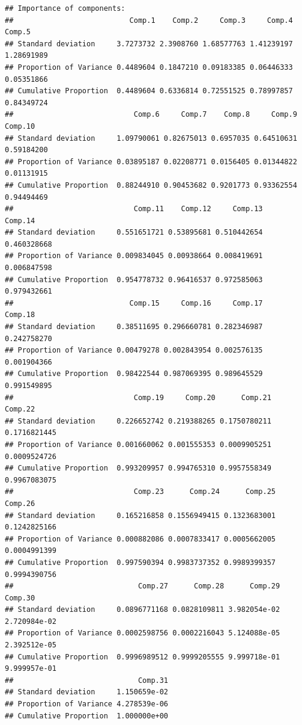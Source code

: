\documentclass[
]{article}
\begin{document}
\begin{verbatim}
## Importance of components:
##                           Comp.1    Comp.2     Comp.3     Comp.4     Comp.5
## Standard deviation     3.7273732 2.3908760 1.68577763 1.41239197 1.28691989
## Proportion of Variance 0.4489604 0.1847210 0.09183385 0.06446333 0.05351866
## Cumulative Proportion  0.4489604 0.6336814 0.72551525 0.78997857 0.84349724
##                            Comp.6     Comp.7    Comp.8     Comp.9    Comp.10
## Standard deviation     1.09790061 0.82675013 0.6957035 0.64510631 0.59184200
## Proportion of Variance 0.03895187 0.02208771 0.0156405 0.01344822 0.01131915
## Cumulative Proportion  0.88244910 0.90453682 0.9201773 0.93362554 0.94494469
##                            Comp.11    Comp.12     Comp.13     Comp.14
## Standard deviation     0.551651721 0.53895681 0.510442654 0.460328668
## Proportion of Variance 0.009834045 0.00938664 0.008419691 0.006847598
## Cumulative Proportion  0.954778732 0.96416537 0.972585063 0.979432661
##                           Comp.15     Comp.16     Comp.17     Comp.18
## Standard deviation     0.38511695 0.296660781 0.282346987 0.242758270
## Proportion of Variance 0.00479278 0.002843954 0.002576135 0.001904366
## Cumulative Proportion  0.98422544 0.987069395 0.989645529 0.991549895
##                            Comp.19     Comp.20      Comp.21      Comp.22
## Standard deviation     0.226652742 0.219388265 0.1750780211 0.1716821445
## Proportion of Variance 0.001660062 0.001555353 0.0009905251 0.0009524726
## Cumulative Proportion  0.993209957 0.994765310 0.9957558349 0.9967083075
##                            Comp.23      Comp.24      Comp.25      Comp.26
## Standard deviation     0.165216858 0.1556949415 0.1323683001 0.1242825166
## Proportion of Variance 0.000882086 0.0007833417 0.0005662005 0.0004991399
## Cumulative Proportion  0.997590394 0.9983737352 0.9989399357 0.9994390756
##                             Comp.27      Comp.28      Comp.29      Comp.30
## Standard deviation     0.0896771168 0.0828109811 3.982054e-02 2.720984e-02
## Proportion of Variance 0.0002598756 0.0002216043 5.124088e-05 2.392512e-05
## Cumulative Proportion  0.9996989512 0.9999205555 9.999718e-01 9.999957e-01
##                             Comp.31
## Standard deviation     1.150659e-02
## Proportion of Variance 4.278539e-06
## Cumulative Proportion  1.000000e+00
\end{verbatim}
\end{document}
